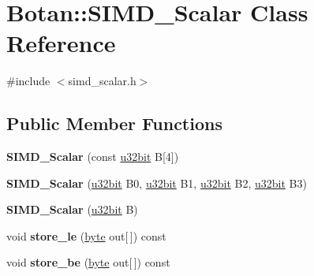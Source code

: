 \hypertarget{classBotan_1_1SIMD__Scalar}{\section{Botan\-:\-:S\-I\-M\-D\-\_\-\-Scalar Class Reference}
\label{classBotan_1_1SIMD__Scalar}
}


{\ttfamily \#include $<$simd\-\_\-scalar.\-h$>$}

\subsection*{Public Member Functions}
\begin{DoxyCompactItemize}
\item 
\hypertarget{classBotan_1_1SIMD__Scalar_af2cebcc2fab500c9a9696b076b4aa4b4}{{\bfseries S\-I\-M\-D\-\_\-\-Scalar} (const \hyperlink{namespaceBotan_aacc7d03c95e97e76168fc1c819031830}{u32bit} B\mbox{[}4\mbox{]})}\label{classBotan_1_1SIMD__Scalar_af2cebcc2fab500c9a9696b076b4aa4b4}

\item 
\hypertarget{classBotan_1_1SIMD__Scalar_acf594a89e29b2afca9ac7f971d1345e3}{{\bfseries S\-I\-M\-D\-\_\-\-Scalar} (\hyperlink{namespaceBotan_aacc7d03c95e97e76168fc1c819031830}{u32bit} B0, \hyperlink{namespaceBotan_aacc7d03c95e97e76168fc1c819031830}{u32bit} B1, \hyperlink{namespaceBotan_aacc7d03c95e97e76168fc1c819031830}{u32bit} B2, \hyperlink{namespaceBotan_aacc7d03c95e97e76168fc1c819031830}{u32bit} B3)}\label{classBotan_1_1SIMD__Scalar_acf594a89e29b2afca9ac7f971d1345e3}

\item 
\hypertarget{classBotan_1_1SIMD__Scalar_ab21bd1610b9a13e105e094700f37632f}{{\bfseries S\-I\-M\-D\-\_\-\-Scalar} (\hyperlink{namespaceBotan_aacc7d03c95e97e76168fc1c819031830}{u32bit} B)}\label{classBotan_1_1SIMD__Scalar_ab21bd1610b9a13e105e094700f37632f}

\item 
\hypertarget{classBotan_1_1SIMD__Scalar_a1ca0ce4dcda0cf846d2303690f6ebce1}{void {\bfseries store\-\_\-le} (\hyperlink{namespaceBotan_a7d793989d801281df48c6b19616b8b84}{byte} out\mbox{[}$\,$\mbox{]}) const }\label{classBotan_1_1SIMD__Scalar_a1ca0ce4dcda0cf846d2303690f6ebce1}

\item 
\hypertarget{classBotan_1_1SIMD__Scalar_ad64796fe287eb74387296ae21a727f59}{void {\bfseries store\-\_\-be} (\hyperlink{namespaceBotan_a7d793989d801281df48c6b19616b8b84}{byte} out\mbox{[}$\,$\mbox{]}) const }\label{classBotan_1_1SIMD__Scalar_ad64796fe287eb74387296ae21a727f59}


\end{DoxyCompactItemize}
